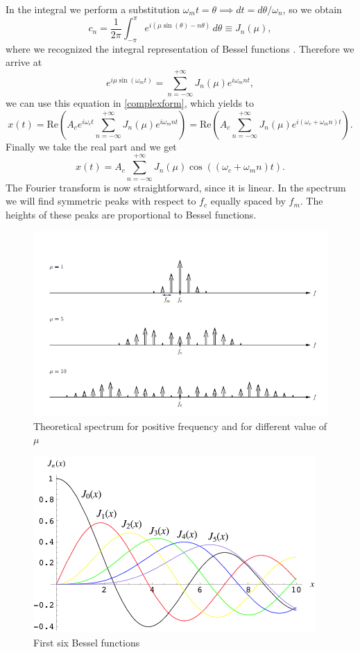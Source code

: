 \documentclass[a4paper,10pt]{article}
\begin{document}
In the integral we perform a substitution $\omega_m t = \theta \implies dt = d\theta/\omega_n$, so we obtain
\[c_n=\frac{1}{2\pi}\int_{-\pi}^{\pi}e^{i(\mu \sin(\theta)-n\theta)}\,d\theta \equiv J_n(\mu),\]
where we recognized the integral representation of Bessel functions \cite{bessel}. Therefore we arrive at
\[e^{i\mu \sin(\omega_m t)} = \sum_{n=-\infty}^{+\infty }J_n(\mu) e^{i\omega_mn t},\]
we can use this equation in \eqref{complexform}, which yields to
\[x(t) =  \text{Re}\left(A_c e^{i\omega_c t}\sum_{n=-\infty}^{+\infty }J_n(\mu) e^{i\omega_mn t}\right) =\text{Re}\left(A_c\sum_{n=-\infty}^{+\infty }J_n(\mu) e^{i(\omega_c +\omega_mn )t}\right).\]
Finally we take the real part and we get
\begin{equation}\label{finalfre}x(t) = A_c \sum_{n=-\infty}^{+\infty }J_n(\mu) \cos((\omega_c +\omega_mn )t).\end{equation}
The Fourier transform is now straightforward, since it is linear. In the spectrum we will find symmetric peaks with respect to $f_c$ equally spaced by $f_m$. The heights of these peaks are proportional to Bessel functions.
\begin{figure}[H]
\centering
\includegraphics[width=.8\textwidth]{freqtheory}
\caption{Theoretical spectrum for positive frequency and for different value of $\mu$}
\end{figure}
\begin{figure}[H]
\centering
\includegraphics[width=.7\textwidth]{besseltheory}
\caption{First six Bessel functions}
\end{figure}
\end{document}
